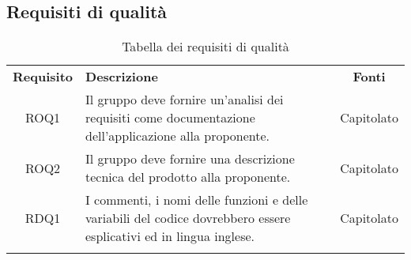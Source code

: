 \subsection{Requisiti di qualità}
\begin{longtable}{| c | p{10cm} | c |}
		\rowcolor{LightBlue}
		\color{white}\bfseries Requisito & \color{white}\bfseries Descrizione & \color{white}\bfseries Fonti\\[0.25cm]
		ROQ1 & Il gruppo deve fornire un'analisi dei requisiti come documentazione dell'applicazione alla proponente. & Capitolato \\
		ROQ2 & Il gruppo deve fornire una descrizione tecnica del prodotto alla proponente. & Capitolato \\ 
		RDQ1 & I commenti, i nomi delle funzioni e delle variabili del codice dovrebbero essere esplicativi ed in lingua inglese. & Capitolato \\ \hline
		\caption{Tabella dei requisiti di qualità}
\end{longtable}